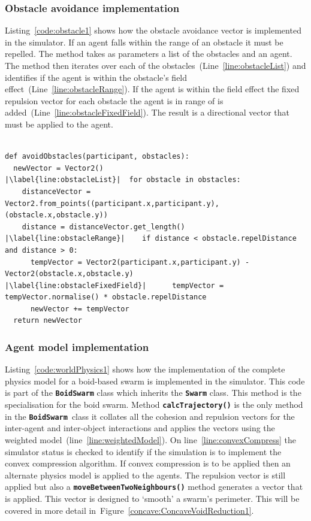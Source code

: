 \subsubsection{Obstacle avoidance implementation}
Listing~\ref{code:obstacle1} shows how the obstacle avoidance vector is implemented in the simulator. If an agent falls within the range of an obstacle it must be repelled. The method takes as parameters a list of the obstacles and an agent. The method then iterates over each of the obstacles~(Line~\ref{line:obstacleList}) and identifies if the agent is within the obstacle's field effect~(Line~\ref{line:obstacleRange}). If the agent is within the field effect the fixed repulsion vector for each obstacle the agent is in range of is added~(Line~\ref{line:obstacleFixedField}). The result is a directional vector that must be applied to the agent.
 
\lstset{language=Python,
basicstyle=\tiny,
numbers=left, 
numberstyle=\tiny,
captionpos=b,
frame=single,
breaklines=true,
caption=Obstacle avoidance code,
escapechar=|
} %
\begin{lstlisting}[label={code:obstacle1}]  % Start your code-block

def avoidObstacles(participant, obstacles):
  newVector = Vector2()
|\label{line:obstacleList}|  for obstacle in obstacles:
    distanceVector = Vector2.from_points((participant.x,participant.y),(obstacle.x,obstacle.y))
    distance = distanceVector.get_length()
|\label{line:obstacleRange}|    if distance < obstacle.repelDistance and distance > 0:
      tempVector = Vector2(participant.x,participant.y) - Vector2(obstacle.x,obstacle.y)
|\label{line:obstacleFixedField}|      tempVector = tempVector.normalise() * obstacle.repelDistance
      newVector += tempVector
  return newVector
\end{lstlisting}

\subsubsection{Agent model implementation}\label{sim:AgentModelImplementation}
Listing~\ref{code:worldPhysics1} shows how the implementation of the complete physics model for a boid-based swarm is implemented in the simulator. This code is part of the \texttt{\textbf{BoidSwarm}} class which inherits the \texttt{\textbf{Swarm}} class. This method is the specialisation for the boid swarm. Method \texttt{\textbf{calcTrajectory()}} is the only method in the \texttt{\textbf{BoidSwarm}}~class it collates all the cohesion and repulsion vectors for the inter-agent and inter-object interactions and applies the vectors using the weighted model~(line~\ref{line:weightedModel}). On line~\ref{line:convexCompress} the simulator status is checked to identify if the simulation is to implement the convex compression algorithm. If convex compression is to be applied then an alternate physics model is applied to the agents. The repulsion vector is still applied but also a \texttt{\textbf{moveBetweenTwoNeighbours()}} method generates a vector that is applied. This vector is designed to `smooth' a swarm's perimeter. This will be covered in more detail in~Figure~\ref{concave:ConcaveVoidReduction1}.

